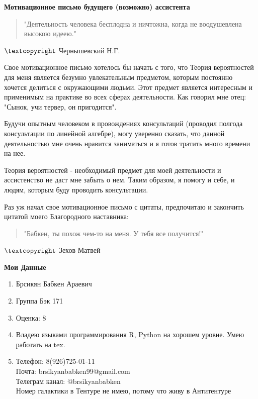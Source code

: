 \documentclass[11pt,a4paper,oneside]{report} %
\begin{document}
	\begin{center}
		\textbf{\large Мотивационное письмо будущего (возможно) ассистента}
	\end{center} 
	\begin{flushleft}
		\begin{verse}
			"Деятельность человека бесплодна и ничтожна, когда не воодушевлена высокою идеею." 
		\end{verse}
	\end{flushleft}
    \begin{flushright}
		$  \textcopyright$ Чернышевский Н.Г.
    \end{flushright}

Свое мотивационное письмо хотелось бы начать с того, что Теория вероятностей для меня является безумно увлекательным предметом, которым постоянно хочется делиться с окружающими людьми. Этот предмет является интересным и применимым на практике во всех сферах деятельности. Как говорил мне отец: "Сынок, учи тервер, он пригодится".

Будучи опытным человеком в провождениях консультаций (проводил полгода консультации по линейной алгебре), могу уверенно сказать, что данной деятельностью мне очень нравится заниматься и я готов тратить много времени на нее. 

Теория вероятностей - необходимый предмет для моей деятельности и ассистенство не даст мне забыть о нем. Таким образом, я помогу и себе, и людям, которым буду проводить консультации. 

Раз уж начал свое мотивационное письмо с цитаты, предпочитаю и закончить цитатой моего Благородного наставника:
	\begin{flushleft}
	\begin{verse}
		"Бабкен, ты похож чем-то на меня. У тебя все получится!" 
	\end{verse}
	\end{flushleft}
	\begin{flushright}
	$  \textcopyright$ Зехов Матвей
	\end{flushright}

	\begin{center}
		\textbf{\large Мои Данные}
	\end{center} 
	\begin{enumerate}
		\item Брсикян Бабкен Араевич
		\item Группа Бэк 171
		\item Оценка: 8
		\item Владею языками программирования R, Python на хорошем уровне. Умею работать на tex.
		\item Телефон: 8(926)725-01-11\\
		Почта: brsikyanbabken99@gmail.com\\
		Телеграм канал: @brsikyanbabken\\
		Номер галактики в Тентуре не имею, потому что живу в Антитентуре
		
	\end{enumerate}
\end{document}
